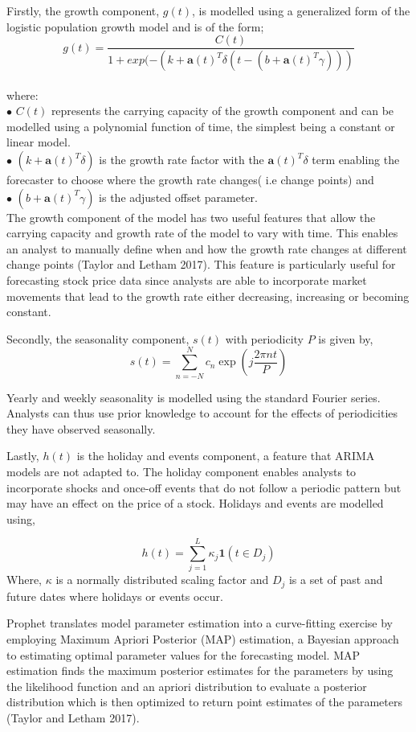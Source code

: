 \documentclass[12pt,a4paper]{article}
\numberwithin{equation}{section}
\numberwithin{figure}{section}
\numberwithin{table}{section}
\begin{document}
Firstly, the growth component, \(g(t)\), is modelled using a generalized
form of the logistic population growth model and is of the form;\\
\[g(t) = \frac{C(t)}{1+exp(-(k+\boldsymbol{a}(t)^T \delta(t-(b+\boldsymbol{a}(t)^T \gamma)))}\]\\
where:\\
\(\bullet\) \(C(t)\) represents the carrying capacity of the growth
component and can be modelled using a polynomial function of time, the
simplest being a constant or linear model.\\
\(\bullet\) \((k+\boldsymbol{a}(t)^T\delta)\) is the growth rate factor
with the \(\boldsymbol{a}(t)^T\delta\) term enabling the forecaster to
choose where the growth rate changes( i.e change points) and\\
\(\bullet\) \((b+\boldsymbol{a}(t)^T \gamma)\) is the adjusted offset
parameter.\\
The growth component of the model has two useful features that allow the
carrying capacity and growth rate of the model to vary with time. This
enables an analyst to manually define when and how the growth rate
changes at different change points (Taylor and Letham 2017). This
feature is particularly useful for forecasting stock price data since
analysts are able to incorporate market movements that lead to the
growth rate either decreasing, increasing or becoming constant.

Secondly, the seasonality component, \(s(t)\) with periodicity \(P\) is
given by, \[s(t) = \sum_{n = -N}^{N}c_n \exp(j\frac{2\pi nt}{P})\]

Yearly and weekly seasonality is modelled using the standard Fourier
series. Analysts can thus use prior knowledge to account for the effects
of periodicities they have observed seasonally.

Lastly, \(h(t)\) is the holiday and events component, a feature that
ARIMA models are not adapted to. The holiday component enables analysts
to incorporate shocks and once-off events that do not follow a periodic
pattern but may have an effect on the price of a stock. Holidays and
events are modelled using,

\[ h(t) = \sum_{j = 1}^{L}\kappa_j \boldsymbol{1}(t \in D_j) \label{eqn5}
\] Where, \(\kappa\) is a normally distributed scaling factor and
\(D_j\) is a set of past and future dates where holidays or events
occur.

Prophet translates model parameter estimation into a curve-fitting
exercise by employing Maximum Apriori Posterior (MAP) estimation, a
Bayesian approach to estimating optimal parameter values for the
forecasting model. MAP estimation finds the maximum posterior estimates
for the parameters by using the likelihood function and an apriori
distribution to evaluate a posterior distribution which is then
optimized to return point estimates of the parameters (Taylor and Letham
2017).
\end{document}
